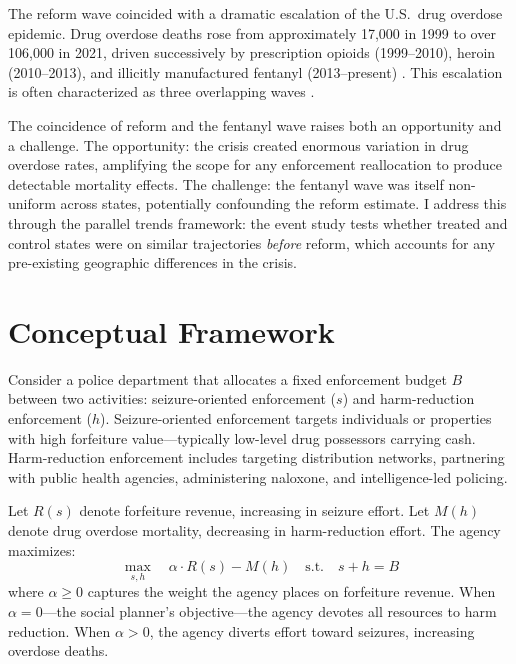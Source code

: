 \documentclass[12pt]{article}
\begin{document}
The reform wave coincided with a dramatic escalation of the U.S.\ drug overdose epidemic. Drug overdose deaths rose from approximately 17,000 in 1999 to over 106,000 in 2021, driven successively by prescription opioids (1999--2010), heroin (2010--2013), and illicitly manufactured fentanyl (2013--present) \citep{ruhm2019drivers, alpert2022origins}. This escalation is often characterized as three overlapping waves \citep{case2020deaths}.

The coincidence of reform and the fentanyl wave raises both an opportunity and a challenge. The opportunity: the crisis created enormous variation in drug overdose rates, amplifying the scope for any enforcement reallocation to produce detectable mortality effects. The challenge: the fentanyl wave was itself non-uniform across states, potentially confounding the reform estimate. I address this through the parallel trends framework: the event study tests whether treated and control states were on similar trajectories \emph{before} reform, which accounts for any pre-existing geographic differences in the crisis.


\section{Conceptual Framework}
\label{sec:framework}

Consider a police department that allocates a fixed enforcement budget $B$ between two activities: seizure-oriented enforcement ($s$) and harm-reduction enforcement ($h$). Seizure-oriented enforcement targets individuals or properties with high forfeiture value---typically low-level drug possessors carrying cash. Harm-reduction enforcement includes targeting distribution networks, partnering with public health agencies, administering naloxone, and intelligence-led policing.

Let $R(s)$ denote forfeiture revenue, increasing in seizure effort. Let $M(h)$ denote drug overdose mortality, decreasing in harm-reduction effort. The agency maximizes:
\begin{equation}
\max_{s,h} \quad \alpha \cdot R(s) - M(h) \quad \text{s.t.} \quad s + h = B
\label{eq:agency}
\end{equation}
where $\alpha \geq 0$ captures the weight the agency places on forfeiture revenue. When $\alpha = 0$---the social planner's objective---the agency devotes all resources to harm reduction. When $\alpha > 0$, the agency diverts effort toward seizures, increasing overdose deaths.
\end{document}

